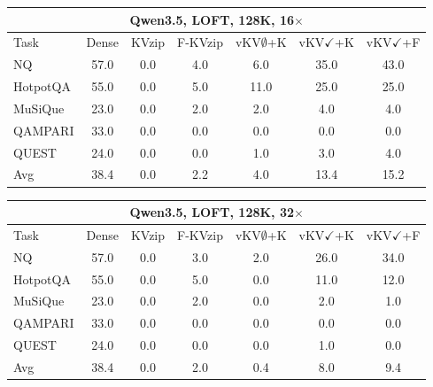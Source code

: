 \begin{tabular}{lcccccc}
\toprule
\multicolumn{7}{c}{Qwen3.5, LOFT, 128K, 16$\times$} \\
\midrule
Task & Dense & KVzip & F-KVzip & vKV$\emptyset$+K & vKV$\checkmark$+K & vKV$\checkmark$+F \\
\midrule
NQ & 57.0 & 0.0 & 4.0 & 6.0 & 35.0 & 43.0 \\
HotpotQA & 55.0 & 0.0 & 5.0 & 11.0 & 25.0 & 25.0 \\
MuSiQue & 23.0 & 0.0 & 2.0 & 2.0 & 4.0 & 4.0 \\
QAMPARI & 33.0 & 0.0 & 0.0 & 0.0 & 0.0 & 0.0 \\
QUEST & 24.0 & 0.0 & 0.0 & 1.0 & 3.0 & 4.0 \\
\midrule
Avg & 38.4 & 0.0 & 2.2 & 4.0 & 13.4 & 15.2 \\
\bottomrule
\end{tabular}
\vspace{0.8em}

\begin{tabular}{lcccccc}
\toprule
\multicolumn{7}{c}{Qwen3.5, LOFT, 128K, 32$\times$} \\
\midrule
Task & Dense & KVzip & F-KVzip & vKV$\emptyset$+K & vKV$\checkmark$+K & vKV$\checkmark$+F \\
\midrule
NQ & 57.0 & 0.0 & 3.0 & 2.0 & 26.0 & 34.0 \\
HotpotQA & 55.0 & 0.0 & 5.0 & 0.0 & 11.0 & 12.0 \\
MuSiQue & 23.0 & 0.0 & 2.0 & 0.0 & 2.0 & 1.0 \\
QAMPARI & 33.0 & 0.0 & 0.0 & 0.0 & 0.0 & 0.0 \\
QUEST & 24.0 & 0.0 & 0.0 & 0.0 & 1.0 & 0.0 \\
\midrule
Avg & 38.4 & 0.0 & 2.0 & 0.4 & 8.0 & 9.4 \\
\bottomrule
\end{tabular}
\vspace{0.8em}

